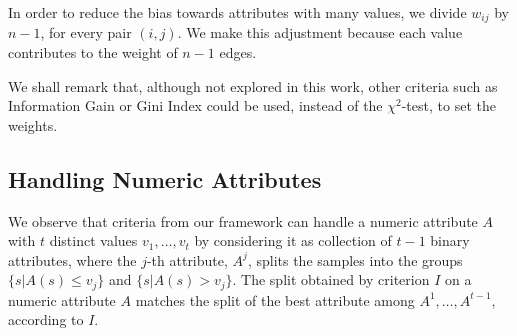 In order to reduce the bias towards attributes with many values, we divide 
$w_{ij}$ by  $n-1$, for every pair $(i,j)$. We make this adjustment  because each value contributes
to the weight of $n-1$ edges.

We shall remark that, although not explored in this work,
other criteria such as Information Gain or Gini Index
could be used, instead of the $\chi^2$-test, to
set the weights.


\subsection{Handling Numeric Attributes}
We observe  that criteria from our framework can handle
 a numeric attribute $A$ with $t$ distinct values
$v_1,\ldots,v_t$
by considering it as collection of 
$t-1$ binary attributes, where the
$j$-th attribute, $A^j$,  splits the samples into the
groups $\{s | A(s) \le v_j \}$ and $\{s | A(s) > v_j \}$. 
The split  obtained by criterion $I$ on a numeric attribute
$A$ matches the split of  the best attribute 
among $A^1,\ldots,A^ {t-1}$, according to $I$.
